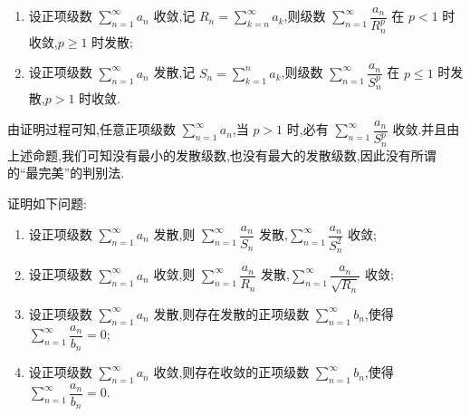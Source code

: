 \documentclass[../../数学分析培优讲义.tex]{subfiles}
\begin{document}
\begin{proposition}[\markstar]
\begin{enumerate}[label=(\arabic*)]
    \item 设正项级数 $\displaystyle\sum\limits_{n=1}^{\infty}a_n$ 收敛,记 $\displaystyle R_n=\sum\limits_{k=n}^{\infty}a_k$,则级数 $\displaystyle\sum\limits_{n=1}^{\infty}\dfrac{a_n}{R_n^p}$ 在 $p<1$ 时收敛,$p\geq1$ 时发散;
    \item 设正项级数 $\displaystyle\sum\limits_{n=1}^{\infty}a_n$ 发散,记 $\displaystyle S_n=\sum\limits_{k=1}^na_k$,则级数 $\displaystyle\sum\limits_{n=1}^{\infty}\dfrac{a_n}{S_n^p}$ 在 $p\leq1$ 时发散,$p>1$ 时收敛.
\end{enumerate}
\end{proposition}

\begin{remark}
由证明过程可知,任意正项级数 $\displaystyle\sum\limits_{n=1}^{\infty}a_n$,当 $p>1$ 时,必有 $\displaystyle\sum\limits_{n=1}^{\infty}\dfrac{a_n}{S_n^p}$ 收敛.并且由上述命题,我们可知没有最小的发散级数,也没有最大的发散级数,因此没有所谓的``最完美''的判别法.
\end{remark}

\begin{example}[\markstar]
证明如下问题:
\begin{enumerate}[label=(\arabic*)]
    \item 设正项级数 $\displaystyle\sum\limits_{n=1}^{\infty}a_n$ 发散,则 $\displaystyle\sum\limits_{n=1}^{\infty}\dfrac{a_n}{S_n}$ 发散,$\displaystyle\sum\limits_{n=1}^{\infty}\dfrac{a_n}{S_n^2}$ 收敛;
    \item 设正项级数 $\displaystyle\sum\limits_{n=1}^{\infty}a_n$ 收敛,则 $\displaystyle\sum\limits_{n=1}^{\infty}\dfrac{a_n}{R_n}$ 发散,$\displaystyle\sum\limits_{n=1}^{\infty}\dfrac{a_n}{\sqrt{R_n}}$ 收敛;
    \item 设正项级数 $\displaystyle\sum\limits_{n=1}^{\infty}a_n$ 发散,则存在发散的正项级数 $\displaystyle\sum\limits_{n=1}^{\infty}b_n$,使得 $\displaystyle\sum\limits_{n=1}^{\infty}\dfrac{a_n}{b_n}=0$;
    \item 设正项级数 $\displaystyle\sum\limits_{n=1}^{\infty}a_n$ 收敛,则存在收敛的正项级数 $\displaystyle\sum\limits_{n=1}^{\infty}b_n$,使得 $\displaystyle\sum\limits_{n=1}^{\infty}\dfrac{a_n}{b_n}=0$.
\end{enumerate}
\end{example}
\exampleblank
\end{document}
